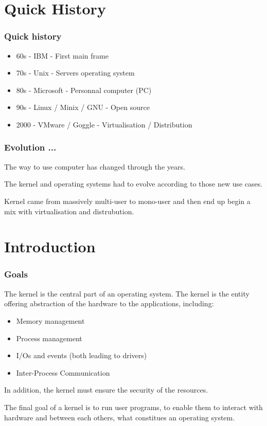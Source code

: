 \tableofcontents

%
%

\section{Quick History}

\begin{frame}
\frametitle{Quick history}

        \begin{itemize}
                \item 60s - IBM - First main frame
                \item 70s - Unix - Servers operating system 
                \item 80s - Microsoft  - Personnal computer (PC)
                \item 90s - Linux / Minix / GNU - Open source
                \item 2000 - VMware / Goggle - Virtualisation / Distribution 
        \end{itemize}

\end{frame}

\begin{frame}
\frametitle{Evolution ...}
The way to use computer has changed through the years.

  \-

The kernel and operating systems had to evolve according to those new
use cases.

  \-

Kernel came from massively multi-user to mono-user and then end up begin
a mix with virtualisation and distrubution.
\end{frame}

\section{Introduction}


\begin{frame}
  \frametitle{Goals}

  The kernel is the central part of an operating system. The kernel is
  the entity offering abstraction of the hardware to the applications,
  including:

  \begin{itemize}
  \item
    Memory management
  \item
    Process management
  \item
    I/Os and events (both leading to drivers)
  \item
    Inter-Process Communication
  \end{itemize}

  In addition, the kernel must ensure the security of the resources.

  \-

  The final goal of a kernel is to run user programs, to enable them
  to interact with hardware and between each others, what constitues
  an operating system.

\end{frame}

